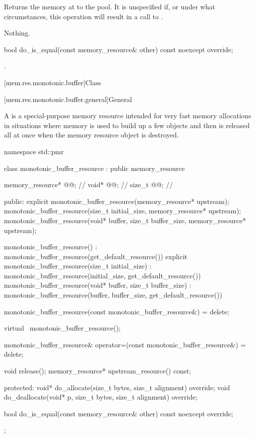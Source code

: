 \begin{itemdescr}
\pnum
\effects
Returns the memory at  to the pool.
It is unspecified if, or under what circumstances,
this operation will result in a call to .

\pnum
\throws
Nothing.
\end{itemdescr}

%
%
\begin{itemdecl}
bool do_is_equal(const memory_resource& other) const noexcept override;
\end{itemdecl}

\begin{itemdescr}
\pnum
\returns
{}.
\end{itemdescr}

[mem.res.monotonic.buffer]{Class }

[mem.res.monotonic.buffer.general]{General}

\pnum
A  is a special-purpose memory resource
intended for very fast memory allocations in situations
where memory is used to build up a few objects
and then is released all at once when the memory resource object is destroyed.

%
\begin{codeblock}
namespace std::pmr {
  class monotonic_buffer_resource : public memory_resource {
    memory_resource* @@;     // \expos
    void* @@;               // \expos
    size_t @@;            // \expos

  public:
    explicit monotonic_buffer_resource(memory_resource* upstream);
    monotonic_buffer_resource(size_t initial_size, memory_resource* upstream);
    monotonic_buffer_resource(void* buffer, size_t buffer_size, memory_resource* upstream);

    monotonic_buffer_resource()
      : monotonic_buffer_resource(get_default_resource()) {}
    explicit monotonic_buffer_resource(size_t initial_size)
      : monotonic_buffer_resource(initial_size, get_default_resource()) {}
    monotonic_buffer_resource(void* buffer, size_t buffer_size)
      : monotonic_buffer_resource(buffer, buffer_size, get_default_resource()) {}

    monotonic_buffer_resource(const monotonic_buffer_resource&) = delete;

    virtual ~monotonic_buffer_resource();

    monotonic_buffer_resource& operator=(const monotonic_buffer_resource&) = delete;

    void release();
    memory_resource* upstream_resource() const;

  protected:
    void* do_allocate(size_t bytes, size_t alignment) override;
    void do_deallocate(void* p, size_t bytes, size_t alignment) override;

    bool do_is_equal(const memory_resource& other) const noexcept override;
  };
}
\end{codeblock}

